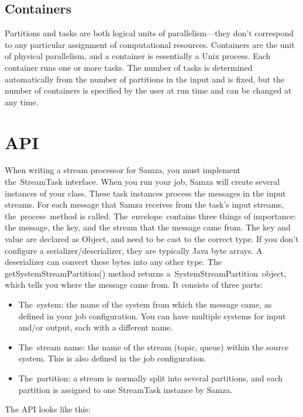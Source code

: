 \documentclass[9pt,twocolumn,twoside]{styles/osajnl}
\begin{document}
\subsection{Containers}
Partitions and tasks are both logical units of parallelism—they don’t correspond
to any particular assignment of computational resources. Containers are the unit
of physical parallelism, and a container is essentially a Unix process. Each
container runs one or more tasks. The number of tasks is determined
automatically from the number of partitions in the input and is fixed, but the
number of containers is specified by the user at run time and can be changed at
any time.\cite{www-samza}

\section{API}
When writing a stream processor for Samza, you must implement the StreamTask
interface. When you run your job, Samza will create several instances of your
class. These task instances process the messages in the input streams. For each
message that Samza receives from the task’s input streams, the process method is
called. The envelope contains three things of importance: the message, the key,
and the stream that the message came from. The key and value are declared as
Object, and need to be cast to the correct type. If you don’t configure a
serializer/deserializer, they are typically Java byte arrays. A deserializer
can convert these bytes into any other type.\cite{www-samza}
The getSystemStreamPartition() method returns a SystemStreamPartition object,
which tells you where the message came from. It consists of three parts:

\begin{itemize}
\renewcommand{\labelitemi}{\scriptsize$\square$} 
\item The system: the name of the system from which the message came, as defined
in your job configuration. You can have multiple systems for input and/or
output, each with a different name.
\item The stream name: the name of the stream (topic, queue) within the source
system. This is also defined in the job configuration.
\item The partition: a stream is normally split into several partitions, and
each partition is assigned to one StreamTask instance by Samza.
\end{itemize}

The API looks like this:\newline
\end{document}
